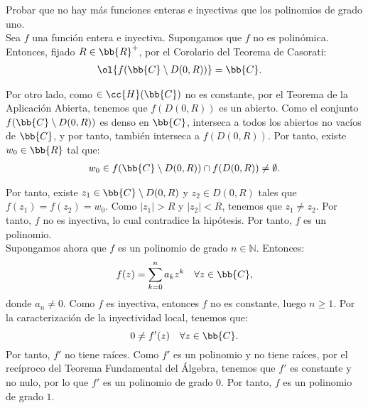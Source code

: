 \documentclass[12pt]{article}
\begin{document}
    \begin{ejercicio}[2.5 puntos]
        Probar que no hay más funciones enteras e inyectivas que los polinomios de grado uno.\\

        Sea $f$ una función entera e inyectiva. Supongamos que $f$ no es polinómica. Entonces, fijado $R\in \bb{R}^+$, por el Corolario del Teorema de Casorati:
        \begin{align*}
            \ol{f(\bb{C}\setminus D(0, R))} &= \bb{C}.
        \end{align*}

        Por otro lado, como $\in \cc{H}(\bb{C})$ no es constante, por el Teorema de la Aplicación Abierta, tenemos que $f(D(0, R))$ es un abierto. Como el conjunto $f(\bb{C}\setminus D(0, R))$ es denso en $\bb{C}$, interseca a todos los abiertos no vacíos de $\bb{C}$, y por tanto, también interseca a $f(D(0, R))$. Por tanto, existe $w_0\in \bb{R}$ tal que:
        \begin{align*}
            w_0\in f(\bb{C}\setminus D(0, R))\cap f(D(0, R))\neq \emptyset.
        \end{align*}

        Por tanto, existe $z_1\in \bb{C}\setminus D(0, R)$ y $z_2\in D(0, R)$ tales que $f(z_1) = f(z_2) = w_0$. Como $|z_1| > R$ y $|z_2| < R$, tenemos que $z_1\neq z_2$. Por tanto, $f$ no es inyectiva, lo cual contradice la hipótesis. Por tanto, $f$ es un polinomio.\\

        Supongamos ahora que $f$ es un polinomio de grado $n\in \mathbb{N}$. Entonces:
        \begin{equation*}
            f(z) = \sum_{k=0}^n a_k z^k \quad \forall z\in \bb{C},
        \end{equation*}
        donde $a_n\neq 0$. Como $f$ es inyectiva, entonces $f$ no es constante, luego $n\geq 1$. Por la caracterización de la inyectividad local, tenemos que:
        \begin{equation*}
            0\neq f'(z) \quad \forall z\in \bb{C}.
        \end{equation*}
        Por tanto, $f'$ no tiene raíces. Como $f'$ es un polinomio y no tiene raíces, por el recíproco del Teorema Fundamental del Álgebra, tenemos que $f'$ es constante y no nulo, por lo que $f'$ es un polinomio de grado $0$. Por tanto, $f$ es un polinomio de grado $1$.
    \end{ejercicio}
\end{document}
